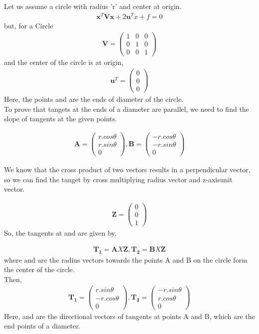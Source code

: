 \documentclass[journal,12pt,twocolumn]{article}
\let\vec\mathbf
\newcommand{\myvec}[1]{\ensuremath{\begin{pmatrix}#1\end{pmatrix}}}
\begin{document}
Let us assume a circle with radius 'r' and center at origin.\\
\begin{align}
	\boldsymbol{x}^{T}\boldsymbol{Vx} + 2\boldsymbol{u}^{T}x + f = 0
\end{align}
but, for a Circle 
\begin{align}
	\boldsymbol{V} = \myvec{ 1 & 0 & 0\\0 & 1&0\\0&0&1}
\end{align}
and the center of the circle is at origin,
\begin{align}
	\boldsymbol{u}^{T} = \myvec{ 0 \\0 \\0}
\end{align}
Here, the points  and  are the ends of diameter of the circle.\\
To prove that tangets at the ends of a diameter are parallel, we need to find the slope of tangents at the given points.

\begin{eqnarray}
	\vec{A} = \myvec{r.cos\theta \\r.sin\theta\\ 0},
	\vec{B} = \myvec{-r.cos\theta \\-r.sin\theta\\0}
\end{eqnarray}

We know that the cross product of two vectors results in a perpendicular vector, so we can find the tanget by cross multiplying radius vector and z-axisunit vector.

\begin{align}
	\vec{Z} = \myvec{0\\0\\1}
\end{align}
So, the tangents at  and  are given by,

\begin{align}
	\boldsymbol{T_1}= \boldsymbol{A} X \boldsymbol{Z},
	\boldsymbol{T_2} = \boldsymbol{B} X \boldsymbol{Z}
\end{align}
where  and  are the radius vectors towards the points A and B on the circle form the center of the circle.\\
Then, 
\begin{eqnarray}
	\vec{T_1} = \myvec{r.sin\theta \\ -r.cos\theta \\ 0},
	\vec{T_2} = \myvec{-r.sin\theta \\ r.cos\theta \\ 0}
\end{eqnarray}
Here,  and  are the directional vectors of tangents at points A and B, which are the end points of a diameter.\\
\end{document}
